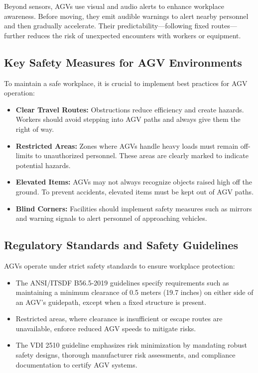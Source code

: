 \documentclass[../../main]{subfiles}
\begin{document}
Beyond sensors, AGVs use visual and audio alerts to enhance 
workplace awareness. Before moving, they emit audible warnings 
to alert nearby personnel and then gradually accelerate. Their 
predictability—following fixed routes—further reduces the risk 
of unexpected encounters with workers or equipment.

\subsection{Key Safety Measures for AGV Environments}
To maintain a safe workplace, it is crucial to implement 
best practices for AGV operation:
\begin{itemize}
    \item \textbf{Clear Travel Routes:} Obstructions reduce 
          efficiency and create hazards. Workers should avoid 
          stepping into AGV paths and always give them the 
          right of way.
    \item \textbf{Restricted Areas:} Zones where AGVs handle 
          heavy loads must remain off-limits to unauthorized 
          personnel. These areas are clearly marked to indicate 
          potential hazards.
    \item \textbf{Elevated Items:} AGVs may not always recognize 
          objects raised high off the ground. To prevent accidents, 
          elevated items must be kept out of AGV paths.
    \item \textbf{Blind Corners:} Facilities should implement 
          safety measures such as mirrors and warning signals 
          to alert personnel of approaching vehicles.
\end{itemize}

\subsection{Regulatory Standards and Safety Guidelines}
AGVs operate under strict safety standards to ensure workplace 
protection:
\begin{itemize}
    \item The ANSI/ITSDF B56.5-2019 \cite{ISO3691-4:2020} guidelines specify requirements 
          such as maintaining a minimum clearance of 0.5 meters 
          (19.7 inches) on either side of an AGV’s guidepath, except 
          when a fixed structure is present.
    \item Restricted areas, where clearance is insufficient or 
          escape routes are unavailable, enforce reduced AGV speeds 
          to mitigate risks.
    \item The VDI 2510 \cite{VDI2510} guideline emphasizes risk minimization by 
          mandating robust safety designs, thorough manufacturer 
          risk assessments, and compliance documentation to certify 
          AGV systems.
\end{itemize}
\end{document}
